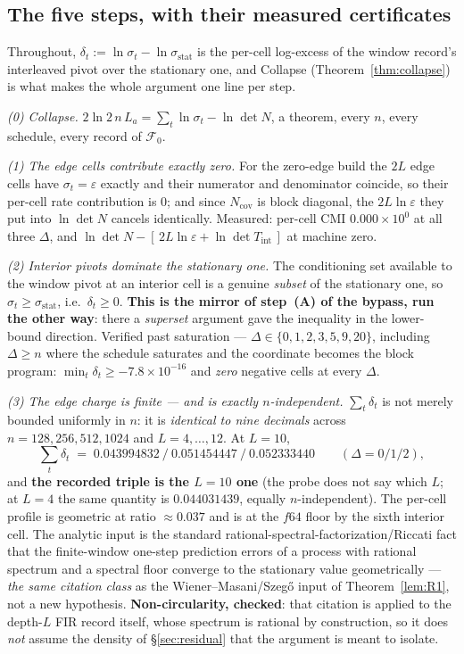 \documentclass[11pt]{article}
\theoremstyle{definition}
\theoremstyle{remark}
\begin{document}
\subsection{The five steps, with their measured certificates}
\label{sec:Wsteps}
Throughout, $\delta_t:=\ln\sigma_t-\ln\sigma_{\mathrm{stat}}$ is the per-cell
log-excess of the window record's interleaved pivot over the stationary one,
and Collapse (Theorem~\ref{thm:collapse}) is what makes the whole argument
one line per step.

\emph{(0) Collapse.} $2\ln2\,n\,L_a=\sum_t\ln\sigma_t-\ln\det N$, a theorem,
every $n$, every schedule, every record of $\mathcal F_0$.

\emph{(1) The edge cells contribute exactly zero.} For the zero-edge build the
$2L$ edge cells have $\sigma_t=\varepsilon$ exactly and their numerator and
denominator coincide, so their per-cell rate contribution is $0$; and since
$N_{\mathrm{cov}}$ is block diagonal, the $2L\ln\varepsilon$ they put into
$\ln\det N$ cancels identically. Measured: per-cell CMI $0.000\times10^{0}$ at
all three $\Delta$, and
$\ln\det N-[\,2L\ln\varepsilon+\ln\det T_{\mathrm{int}}\,]$ at machine zero.

\emph{(2) Interior pivots dominate the stationary one.} The conditioning set
available to the window pivot at an interior cell is a genuine \emph{subset}
of the stationary one, so $\sigma_t\ge\sigma_{\mathrm{stat}}$, i.e.\
$\delta_t\ge0$. \textbf{This is the mirror of step~(A) of the bypass, run the
other way}: there a \emph{superset} argument gave the inequality in the
lower-bound direction. Verified past saturation --- $\Delta\in\{0,1,2,3,5,9,
20\}$, including $\Delta\ge n$ where the schedule saturates and the coordinate
becomes the block program: $\min_t\delta_t\ge-7.8\times10^{-16}$ and
\emph{zero} negative cells at every $\Delta$.

\emph{(3) The edge charge is finite --- and is exactly $n$-independent.}
$\sum_t\delta_t$ is not merely bounded uniformly in $n$: it is
\emph{identical to nine decimals} across $n=128,256,512,1024$ and
$L=4,\dots,12$. At $L=10$,
\[
\textstyle\sum_t\delta_t\;=\;0.043994832\ /\ 0.051454447\ /\ 0.052333440
\qquad(\Delta=0/1/2),
\]
and \textbf{the recorded triple is the $L=10$ one} (the probe does not say
which $L$; at $L=4$ the same quantity is $0.044031439$, equally
$n$-independent). The per-cell profile is geometric at ratio
$\approx0.037$ and is at the $f64$ floor by the sixth interior cell. The
analytic input is the standard rational-spectral-factorization/Riccati fact
\cite{bib:am79,bib:ksh00} that the finite-window one-step prediction errors of
a process with rational spectrum and a spectral floor converge to the
stationary value geometrically --- \emph{the same citation class} as the
Wiener--Masani/Szeg\H o input of Theorem~\ref{lem:R1}, not a new hypothesis.
\textbf{Non-circularity, checked}: that citation is applied to the depth-$L$
FIR record itself, whose spectrum is rational by construction, so it does
\emph{not} assume the density of \S\ref{sec:residual} that the argument is
meant to isolate.
\end{document}
